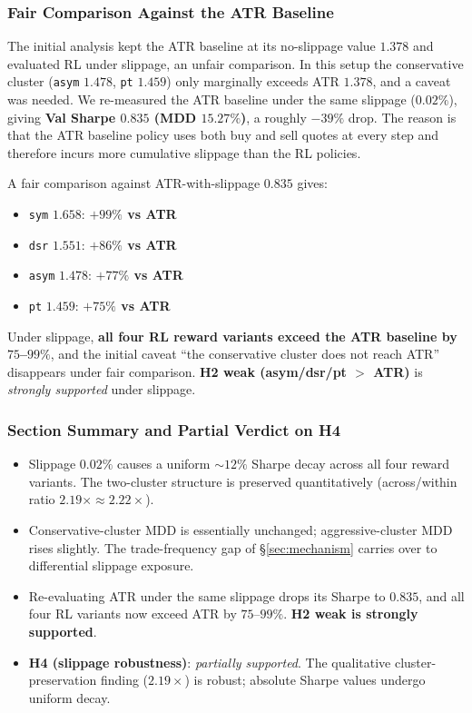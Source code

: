 \documentclass[11pt, a4paper]{article}
\begin{document}
\subsubsection{Fair Comparison Against the ATR Baseline}
\label{sec:slippage_atr_fair}

The initial analysis kept the ATR baseline at its no-slippage value $1.378$
and evaluated RL under slippage, an unfair comparison. In this setup the
conservative cluster (\texttt{asym} $1.478$, \texttt{pt} $1.459$) only
marginally exceeds ATR $1.378$, and a caveat was needed. We re-measured the
ATR baseline under the same slippage ($0.02\%$), giving \textbf{Val Sharpe
$0.835$ (MDD $15.27\%$)}, a roughly
$-39\%$ drop. The reason is that the ATR baseline policy uses both buy and
sell quotes at every step and therefore incurs more cumulative slippage than
the RL policies.

A fair comparison against ATR-with-slippage $0.835$ gives:
\begin{itemize}[leftmargin=*]
\item \texttt{sym} $1.658$: \textbf{$+99\%$ vs ATR}
\item \texttt{dsr} $1.551$: \textbf{$+86\%$ vs ATR}
\item \texttt{asym} $1.478$: \textbf{$+77\%$ vs ATR}
\item \texttt{pt} $1.459$: \textbf{$+75\%$ vs ATR}
\end{itemize}
Under slippage, \textbf{all four RL reward variants exceed the ATR baseline
by $75$--$99\%$}, and the initial caveat ``the conservative cluster does not
reach ATR'' disappears under fair comparison. \textbf{H2 weak (asym/dsr/pt
$>$ ATR)} is \emph{strongly supported} under slippage.

\subsubsection{Section Summary and Partial Verdict on H4}
\label{sec:slippage_conclusion}

\begin{itemize}[leftmargin=*]
\item Slippage $0.02\%$ causes a uniform $\sim 12\%$ Sharpe decay across all
four reward variants. The two-cluster structure is preserved
quantitatively (across/within ratio $2.19\times \approx 2.22\times$).
\item Conservative-cluster MDD is essentially unchanged; aggressive-cluster
MDD rises slightly. The trade-frequency gap of \S\ref{sec:mechanism} carries
over to differential slippage exposure.
\item Re-evaluating ATR under the same slippage drops its Sharpe to $0.835$,
and all four RL variants now exceed ATR by $75$--$99\%$. \textbf{H2 weak is
strongly supported}.
\item \textbf{H4 (slippage robustness)}: \emph{partially supported}. The
qualitative cluster-preservation finding ($2.19\times$) is robust; absolute
Sharpe values undergo uniform decay.
\end{itemize}
\end{document}
